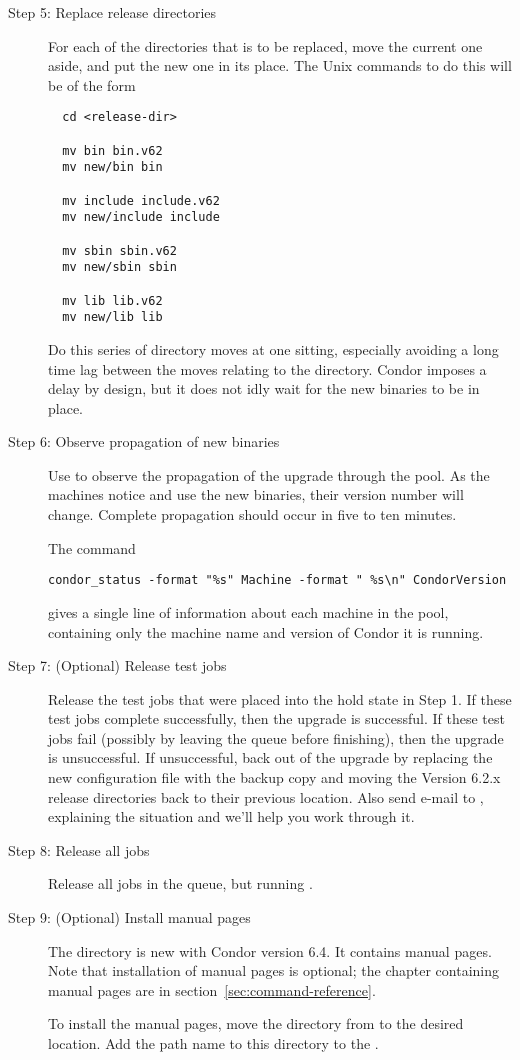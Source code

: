 \begin{description}
\item[Step 5:  Replace release directories]
For each of the directories that is to be replaced,
move the current one aside, and put the new one in its place.
The Unix commands to do this will be of the form
\begin{verbatim}
  cd <release-dir>

  mv bin bin.v62
  mv new/bin bin

  mv include include.v62
  mv new/include include

  mv sbin sbin.v62
  mv new/sbin sbin

  mv lib lib.v62
  mv new/lib lib
\end{verbatim}

Do this series of directory moves at one
sitting, especially avoiding a long time lag between the moves
relating to the  directory.
Condor imposes a delay by design, but it does not idly wait for the
new binaries to be in place.

\item[Step 6:  Observe propagation of new binaries]

Use  to observe the propagation of the upgrade
through the pool.
As the machines notice and use the new binaries, their
version number will change.
Complete propagation should occur in five to ten minutes.

The command
\begin{verbatim}
condor_status -format "%s" Machine -format " %s\n" CondorVersion
\end{verbatim}
gives a single line of information about each machine in the pool,
containing only the machine name and version of Condor it is
running.

\item[Step 7:  (Optional) Release test jobs]
Release the test jobs that were placed into the hold state
in Step 1.
If these test jobs complete successfully, then the upgrade is
successful.
If these test jobs fail (possibly by leaving the queue before
finishing), then the upgrade is unsuccessful.
If unsuccessful, back out of the upgrade by
replacing the new configuration file with the backup copy and
moving the Version 6.2.x release directories back to their
previous location.
Also send e-mail to ,
explaining the situation and we'll help you work through it.

\item[Step 8:  Release all jobs]
Release all jobs in the queue, but running .

\item[Step 9:  (Optional) Install manual pages]

The  directory is new with Condor version 6.4.
It contains manual pages.
Note that installation of manual pages is optional;
the chapter containing manual pages are in
section~\ref{sec:command-reference}.

To install the manual pages, move the  directory
from  to the desired location.
Add the path name to this directory to the
.

\end{description}

